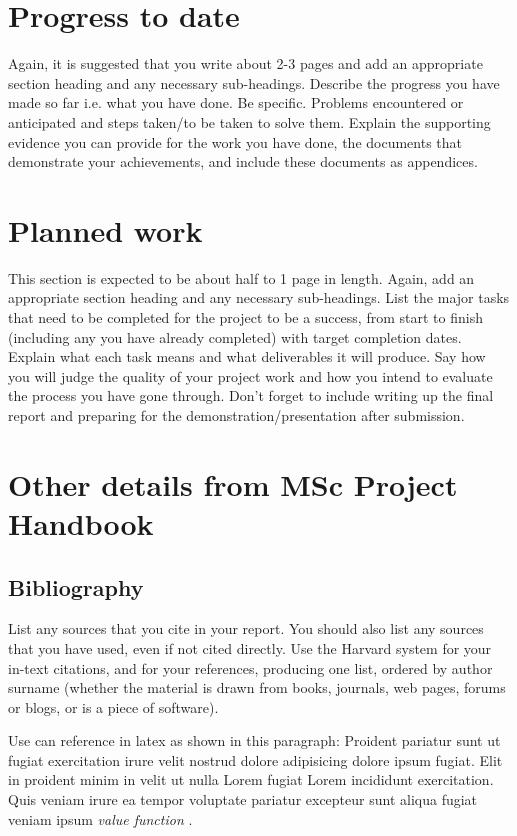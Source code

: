 \documentclass[a4paper, notitlepage, 11pt]{article}
\begin{document}
\section{Progress to date}

Again, it is suggested that you write about 2-3 pages and add an appropriate section heading and any necessary sub-headings. Describe the progress you have made so far i.e. what you have done. Be specific. Problems encountered or anticipated and steps taken/to be taken to solve them. Explain the supporting evidence you can provide for the work you have done, the documents that demonstrate your achievements, and include these documents as appendices.

\section{Planned work}

This section is expected to be about half to 1 page in length. Again, add an appropriate section heading and any necessary sub-headings. List the major tasks that need to be completed for the project to be a success, from start to finish (including any you have already completed) with target completion dates. Explain what each task means and what deliverables it will produce. Say how you will judge the quality of your project work and how you intend to evaluate the process you have gone through. Don't forget to include writing up the final report and preparing for the demonstration/presentation after submission.

\section{Other details from MSc Project Handbook}

\subsection{Bibliography}

List any sources that you cite in your report. You should also list any sources that you have used, even if not cited directly. Use the Harvard system for your in-text citations, and for your references, producing one list, ordered by author surname (whether the material is drawn from books, journals, web pages, forums or blogs, or is a piece of software).

Use can reference in latex as shown in this paragraph: Proident pariatur sunt ut fugiat exercitation irure velit nostrud dolore adipisicing dolore ipsum fugiat. Elit in proident minim in velit ut nulla Lorem fugiat Lorem incididunt exercitation. Quis veniam irure ea tempor voluptate pariatur excepteur sunt aliqua fugiat veniam ipsum \emph{value function}  \citep{Sutton2018}.
\end{document}
